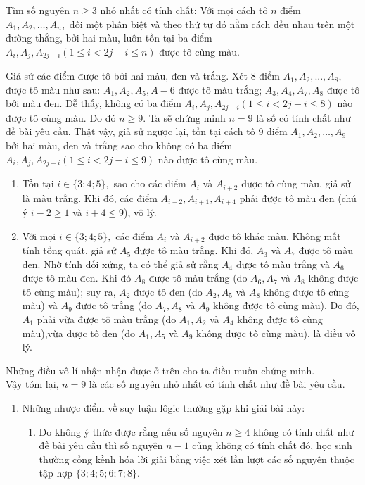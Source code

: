 \begin{bt}%
Tìm số nguyên $n\geq 3$ nhỏ nhất có tính chất: Với mọi cách tô $n$ điểm $A_1, A_2,\dots,A_n,$ đôi một phân biệt và theo thứ tự đó nằm cách đều nhau trên một đường thẳng, bởi hai màu, luôn tồn tại ba điểm $A_i,A_j,A_{2j-i} (1\leq i<2j-i\leq n) $ được tô  cùng màu.
\loigiai
{Giả sử các điểm được tô bởi hai màu, đen và trắng. 	
Xét 8 điểm $A_1, A_2,...,A_8,$ được tô màu như sau: $A_1, A_2,A_5,A-6$ được tô màu trắng; $A_3, A_4,A_7,A_8$ được tô bởi màu đen. Dễ thấy, không có ba điểm $A_i,A_j,A_{2j-i}  (1\leq i< 2j-i\leq 8) $ nào được tô cùng màu. 
Do đó $n\geq 9.$
Ta sẽ chứng minh $n=9$ là số có tính  chất như đề bài yêu cầu.
Thật vậy, giả sử ngược lại, tồn tại cách tô 9 điểm  $A_1, A_2,\dots,A_9$ bởi hai màu, đen và trắng sao cho không có ba điểm $A_i,A_j,A_{2j-i}  (1\leq i< 2j-i\leq 9) $ nào được tô cùng màu. 
\begin{enumerate}
	\item Tồn tại $i\in \{3;4;5\},$ sao cho các điểm $A_i$ và $A_{i+2}$ được tô cùng màu, giả sử là màu trắng. Khi đó, các điểm $A_{i-2},A_{i+1}, A_{i+4}$ phải được tô màu đen (chú ý $i-2\geq 1$ và $i+4\leq 9$), vô lý.
	\item  Với mọi $i\in \{3;4;5\},$  các điểm $A_i$ và $A_{i+2}$ được tô khác màu.
	Không mất tính tổng quát, giả sử $A_5$ được tô màu trắng. Khi đó, $A_{3} $ và $A_7$ được tô màu đen. Nhờ tính đối xứng, ta có thể giả sử rằng $A_4$ được tô màu trắng và $A_6$ được tô màu đen. Khi đó $A_8$ được tô màu trắng (do $A_6, A_7$ và $A_8$ không được tô cùng màu); suy ra, $A_2$ được tô đen (do $A_2, A_5$ và $A_8$  không được tô cùng màu) và $A_9$ được tô trắng (do $A_7,A_8$ và $A_9$ không được tô cùng màu). Do đó, $A_1$ phải vừa được tô màu trắng (do $A_1,A_2 $ và $A_4$ không được tô cùng màu),vừa được tô đen (do $A_1, A_5$ và $A_9$ không được tô cùng màu), là điều vô lý.
\end{enumerate}
Những điều vô lí nhận nhận được ở trên cho ta điều muốn chứng minh.\\	
Vậy tóm lại, $n=9$ là các số nguyên nhỏ nhất có tính chất như đề bài yêu cầu.
\begin{nx}\hfill
\begin{enumerate}[1]
	\item 	Những nhược điểm về suy luận lôgic thường gặp khi giải bài này:
	\begin{enumerate}[-]
		\item Do không ý thức được rằng nếu số nguyên $n\geq 4$ không có tính chất như đề bài yêu cầu thì số nguyên $n-1$ cũng không có tính chất đó, học sinh thường cồng kềnh hóa lời giải bằng việc xét lần lượt các số nguyên thuộc tập hợp $\{3;4;5;6;7;8\}.$

\end{enumerate}
\end{enumerate}
\end{nx}}
\end{bt}
